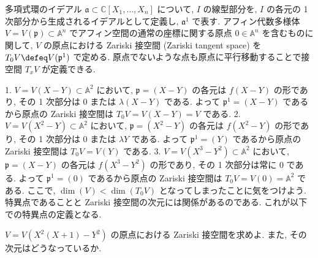 \documentclass[openany, a4paper, oneside]{jsbook}
\begin{document}
\begin{defn}[ザリスキ接空間]
多項式環のイデアル $\mathfrak{a} \subset \mathbb{C}[X_1,\dots,X_n]$ について,
$I$ の線型部分を, $I$ の各元の 1 次部分から生成されるイデアルとして定義し,
$\mathfrak{a}^1$ で表す.
アフィン代数多様体 $V = V (\mathfrak{p}) \subset \mathbb{A}^n$
でアフィン空間の通常の座標に関する原点 $0 \in \mathbb{A}^n$ を含むものに関して,
$V$ の原点における Zariski 接空間 (Zariski tangent space) を
$T_0V \defeq  V (\mathfrak{p}^1)$ で定める.
原点でないような点も原点に平行移動することで接空間 $T_xV$ が定義できる. \fin
\end{defn}
\begin{ex}
1. $V=V (X-Y) \subset \mathbb{A}^2$ において,
   $\mathfrak{p}=(X-Y)$ の各元は $f (X-Y)$ の形であり,
   その 1 次部分は $0$ または $\lambda (X-Y)$ である.
   よって $\mathfrak{p}^1 = (X-Y)$ であるから原点の Zariski 接空間は $T_0V=V (X-Y)=V$ である.
2. $V=V (X^2-Y) \subset \mathbb{A}^2$ において,
   $\mathfrak{p}=(X^2-Y)$ の各元は $f (X^2-Y)$ の形であり,
   その 1 次部分は $0$ または $\lambda Y$ である.
   よって $\mathfrak{p}^1 = (Y)$ であるから原点の Zariski 接空間は $T_0V=V (Y)$ である.
3. $V=V (X^3-Y^2) \subset \mathbb{A}^2$ において,
   $\mathfrak{p}=(X-Y)$ の各元は $f (X^3-Y^2)$ の形であり,
   その 1 次部分は常に $0$ である.
   よって $\mathfrak{p}^1 = (0)$ であるから原点の Zariski 接空間は $T_0V=V (0)=\mathbb{A}^2$ である.
   ここで, $\dim (V) < \dim (T_0V)$ となってしまったことに気をつけよう.
   特異点であることと Zariski 接空間の次元には関係があるのである.
   これが以下での特異点の定義となる. \fin
\end{ex}
\begin{exercise}
$V=V (X^2 (X+1)-Y^2)$ の原点における Zariski 接空間を求めよ.
また, その次元はどうなっているか. \fin
\end{exercise}
\end{document}
